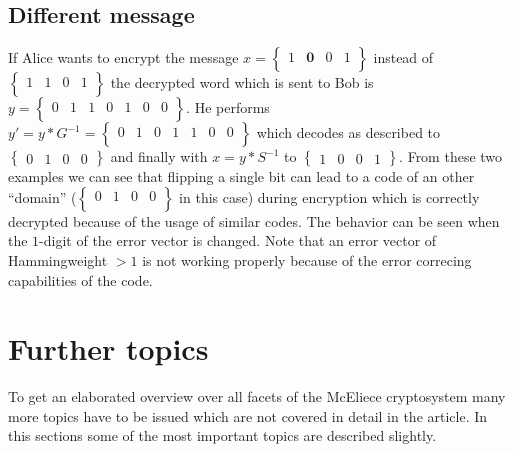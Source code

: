 \subsection{Different message}
If Alice wants to encrypt the message
	$
	x =
	\begin{Bmatrix}
	1 & \textbf{0} & 0 & 1 \\
	\end{Bmatrix}
	$  instead of 	$
	\begin{Bmatrix}
	1 & 1 & 0 & 1 \\
	\end{Bmatrix}
	$ the decrypted word which is sent to Bob is 
	$
	y = 
	\begin{Bmatrix}
	0 & 1 & 1 & 0 & 1 & 0 & 0 \\
	\end{Bmatrix}
	$. He performs
	$
	y' = y*G^{-1} =
	\begin{Bmatrix}
	0 & 1 & 0 & 1 & 1 & 0 & 0 \\
	\end{Bmatrix}
	$ which decodes as described to 
$
\begin{Bmatrix}
0 & 1 & 0 & 0
\end{Bmatrix}
$ and finally with $x = y * S^{-1}$ to
$
\begin{Bmatrix}
1 & 0 & 0 & 1
\end{Bmatrix}
$.
From these two examples we can see that flipping a single bit can lead to a code of an other ``domain'' ($
\begin{Bmatrix}
0 & 1 & 0 & 0 \\
\end{Bmatrix}
$ in this case) during encryption which is correctly decrypted because of the usage of similar codes.
The behavior can be seen when the $1$-digit of the error vector is changed. Note that an error vector of Hammingweight $> 1$ is not working properly because of the error correcing capabilities of the code. 

\section{Further topics}
\label{further_topics}
To get an elaborated overview over all facets of the McEliece cryptosystem many more topics have to be issued which are not covered in detail in the article. In this sections some of the most important topics are described slightly. 


